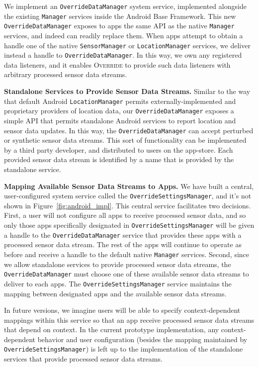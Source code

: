\documentclass[10pt]{sensys-proc}
\begin{document}
We implement an \texttt{OverrideDataManager} system service, implemented alongside the existing \texttt{Manager} services inside the Android Base Framework. This new \texttt{OverrideDataManager} exposes to apps the same API as the native \texttt{Manager} services, and indeed can readily replace them. When apps attempt to obtain a handle one of the native \texttt{SensorManager} or \texttt{LocationManager} services, we deliver instead a handle to \texttt{OverrideDataManager}. In this way, we own any registered data listeners, and it enables \textsc{Override} to provide such data listeners with arbitrary processed sensor data streams.

\textbf{Standalone Services to Provide Sensor Data Streams.} Similar to the way that default Android \texttt{LocationManager} permits externally-implemented and proprietary providers of location data, our \texttt{OverrideDataManager} exposes a simple API that permits standalone Android services to report location and sensor data updates. In this way, the \texttt{OverrideDataManager} can accept perturbed or synthetic sensor data streams. This sort of functionality can be implemented by a third party developer, and distributed to users on the app-store. Each provided sensor data stream is identified by a name that is provided by the standalone service.

\textbf{Mapping Available Sensor Data Streams to Apps.} We have built a central, user-configured system service called the \texttt{OverrideSettingsManager}, and it's not shown in Figure~\ref{fig:android_impl}. This central service facilitates two decisions. First, a user will not configure all apps to receive processed sensor data, and so only those apps specifically designated in \texttt{OverrideSettingsManager} will be given a handle to the \texttt{OverrideDataManager} service that provides these apps with a processed sensor data stream. The rest of the apps will continue to operate as before and receive a handle to the default native \texttt{Manager} services. Second, since we allow standalone services to provide processed sensor data streams, the \texttt{OverrideDataManager} must choose one of these available sensor data streams to deliver to each apps. The \texttt{OverrideSettingsManager} service maintains the mapping between designated apps and the available sensor data streams.

In future versions, we imagine users will be able to specify context-dependent mappings within this service so that an app receive processed sensor data streams that depend on context. In the current prototype implementation, any context-dependent behavior and user configuration (besides the mapping maintained by \texttt{OverrideSettingsManager}) is left up to the implementation of the standalone services that provide processed sensor data streams.
\end{document}
